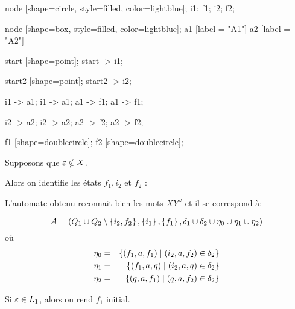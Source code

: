 \begin{proofI}
\begin{itemize}
{			      node [shape=circle, style=filled, color=lightblue];
			      i1;
			      f1;
			      i2;
			      f2;

			      node [shape=box, style=filled, color=lightblue];
			      a1 [label = "A1"]
			      a2 [label = "A2"]

			      start [shape=point];
			      start -> i1;


			      start2 [shape=point];
			      start2 -> i2;

			      i1 -> a1;
			      i1 -> a1;
			      a1 -> f1;
			      a1 -> f1;


			      i2 -> a2;
			      i2 -> a2;
			      a2 -> f2;
			      a2 -> f2;

			      f1 [shape=doublecircle];
			      f2 [shape=doublecircle];
		      }

		      Supposons que $\varepsilon \notin X$.

		      Alors on identifie les états $f_1,i_2$ et $f_2$ :


		      L'automate obtenu reconnait bien les mots $XY^{\omega}$ et il se correspond à:

		      $$ A = ( Q_1 \cup Q_2 \setminus \left\{i_2,f_2\right\}, \left\{i_1\right\}, \left\{f_1\right\}, \delta_1 \cup \delta_2 \cup \eta_0 \cup \eta_1 \cup \eta_2)$$
		      où
		      \begin{eqnarray*}
			      \eta_0 &=& \left\{(f_1,a,f_1) \mid (i_2,a,f_2) \in \delta_2\right\} \\
			      \eta_1 &=& \left\{(f_1,a,q) \mid (i_2,a,q) \in \delta_2\right\} \\
			      \eta_2 &=& \left\{(q,a,f_1) \mid (q,a,f_2) \in \delta_2\right\}
		      \end{eqnarray*}


		      Si $\varepsilon \in L_1$, alors on rend $f_1$ initial.
	\end{itemize}
\end{proofI}

